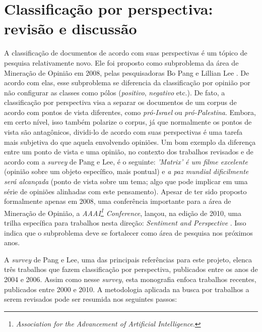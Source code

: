 


\chapter{Classificação por perspectiva: revisão e discussão}
\label{chap3}

A classificação de documentos de acordo com suas perspectivas é um tópico de pesquisa relativamente novo. Ele foi proposto como subproblema da área de Mineração de Opinião em 2008, pelas pesquisadoras Bo Pang e Lillian Lee \cite{omsa}. De acordo com elas, esse subproblema se diferencia da classificação por opinião por não configurar as classes como pólos (\emph{positivo}, \emph{negativo} etc.). De fato, a classificação por perspectiva visa a separar os documentos de um corpus de acordo com pontos de vista diferentes, como \emph{pró-Israel} ou \emph{pró-Palestina}. Embora, em certo nível, isso também polarize o corpus, já que normalmente os pontos de vista são antagônicos, dividi-lo de acordo com suas perspectivas é uma tarefa mais subjetiva do que aquela envolvendo opiniões. Um bom exemplo da diferença entre um ponto de vista e uma opinião, no contexto dos trabalhos revisados e de acordo com a \emph{survey} de Pang e Lee, é o seguinte: \emph{'Matrix' é um filme excelente} (opinião sobre um objeto específico, mais pontual) e \emph{a paz mundial dificilmente será alcançada} (ponto de vista sobre um tema; algo que pode implicar em uma série de opiniões alinhadas com este pensamento). Apesar de ter sido proposto formalmente apenas em 2008, uma conferência importante para a área de Mineração de Opinião, a \emph{AAAI\footnote{\emph{Association for the Advancement of Artificial Intelligence}.} Conference}, lançou, na edição de 2010, uma trilha específica para trabalhos nesta direção: \emph{Sentiment and Perspective} \cite{aaai2010}. Isso indica que o subproblema deve se fortalecer como área de pesquisa nos próximos anos.

A \emph{survey} de Pang e Lee, uma das principais referências para este projeto, elenca três trabalhos que fazem classificação por perspectiva, publicados entre os anos de 2004 e 2006. Assim como nesse \emph{survey}, esta monografia enfoca trabalhos recentes, publicados entre 2000 e 2010. A metodologia aplicada na busca por trabalhos a serem revisados pode ser resumida nos seguintes passos:

